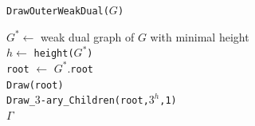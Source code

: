 \begin{algorithm}[H]
	\caption{\texttt{DrawOuterWeakDual($G$)}}\label{al:drawouterweakdual}
	$G^* \gets$ weak dual graph of $G$ with minimal height\\
	$h \gets$ \texttt{height($G^*$)}\\
	\texttt{root} $\gets$ $G^*$.\texttt{root}\\
	\texttt{Draw(root)}\\
	\texttt{Draw\_$3$-ary\_Children(\texttt{root},$3^h$,1)}\\
	\Return $\Gamma$
\end{algorithm}

